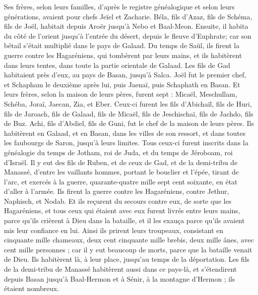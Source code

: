 \begin{multicols}{2}
Ses frères, selon leurs familles, d’après le registre généalogique et selon leurs générations, avaient pour chefs Jeïel et Zacharie.
Béla, fils d’Azaz, fils de Schéma, fils de Joël, habitait depuis Aroër jusqu'à Nebo et Baal-Meon.
Ensuite, il habita du côté de l’orient jusqu'à l'entrée du désert, depuis le fleuve d'Euphrate; car son bétail s'était multiplié dans le pays de Galaad.
Du temps de Saül, ils firent la guerre contre les Hagaréniens, qui tombèrent par leurs mains, et ils habitèrent dans leurs tentes, dans toute la partie orientale de Galaad.
Les fils de Gad habitaient près d'eux, au pays de Basan, jusqu'à Salca.
Joël fut le premier chef, et Schapham le deuxième après lui, puis Jaenaï, puis Schaphath en Basan.
Et leurs frères, selon la maison de leurs pères, furent sept : Micaël, Meschullam, Schéba, Joraï, Jaecan, Zia, et Eber.
Ceux-ci furent les fils d'Abichaïl, fils de Huri, fils de Jaroach, fils de Galaad, fils de Micaël, fils de Jeschischaï, fils de Jachdo, fils de Buz.
Achi, fils d'Abdiel, fils de Guni, fut le chef de la maison de leurs pères.
Ils habitèrent en Galaad, et en Basan, dans les villes de son ressort, et dans toutes les faubourgs de Saron, jusqu’à leurs limites.
Tous ceux-ci furent inscrits dans la généalogie du temps de Jotham, roi de Juda, et du temps de Jéroboam, roi d'Israël.
Il y eut des fils de Ruben, et de ceux de Gad, et de la demi-tribu de Manassé, d'entre les vaillants hommes, portant le bouclier et l'épée, tirant de l'arc, et exercés à la guerre, quarante-quatre mille sept cent soixante, en état d’aller à l’armée.
Ils firent la guerre contre les Hagaréniens, contre Jethur, Naphisch, et Nodab.
Et ils reçurent du secours contre eux, de sorte que les Hagaréniens, et tous ceux qui étaient avec eux furent livrés entre leurs mains, parce qu'ils crièrent à Dieu dans la bataille, et il les exauça parce qu'ils avaient mis leur confiance en lui.
Ainsi ils prirent leurs troupeaux, consistant en cinquante mille chameaux, deux cent cinquante mille brebis, deux mille ânes, avec cent mille personnes ;
car il y eut beaucoup de morts, parce que la bataille venait de Dieu. Ils habitèrent là, à leur place, jusqu'au temps de la déportation.
Les fils de la demi-tribu de Manassé habitèrent aussi dans ce pays-là, et s'étendirent depuis Basan jusqu'à Baal-Hermon et à Sénir, à la montagne d’Hermon ; ils étaient nombreux.

\end{multicols}
